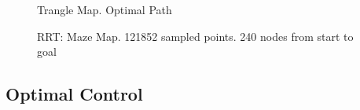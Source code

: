 \documentclass[letterpaper, 10 pt, conference]{ieeeconf}  %
\begin{document}
 \begin{figure}[h]
    \centering
    \caption{Trangle Map. Optimal Path}
    \label{fig:map1}
 \end{figure}

 \begin{figure}[h]
    \centering
    \caption{RRT: Maze Map. 121852 sampled points. 240 nodes from start to goal}
    \label{fig:map1}
 \end{figure}

 \subsection{Optimal Control}
 







\end{document}
